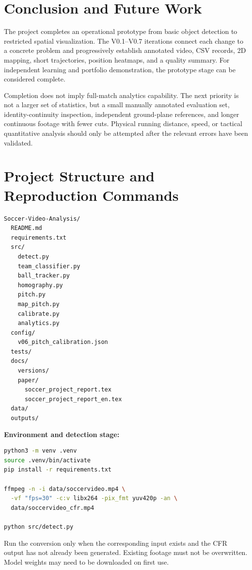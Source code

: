 \documentclass[11pt,a4paper]{article}
\begin{document}
\section{Conclusion and Future Work}

The project completes an operational prototype from basic object detection
to restricted spatial visualization.
The V0.1--V0.7 iterations connect each change to a concrete problem and
progressively establish annotated video, CSV records, 2D mapping, short
trajectories, position heatmaps, and a quality summary.
For independent learning and portfolio demonstration, the prototype stage
can be considered complete.

Completion does not imply full-match analytics capability.
The next priority is not a larger set of statistics, but a small manually
annotated evaluation set, identity-continuity inspection, independent
ground-plane references, and longer continuous footage with fewer cuts.
Physical running distance, speed, or tactical quantitative analysis should
only be attempted after the relevant errors have been validated.

\appendix
\section{Project Structure and Reproduction Commands}

\begin{lstlisting}
Soccer-Video-Analysis/
  README.md
  requirements.txt
  src/
    detect.py
    team_classifier.py
    ball_tracker.py
    homography.py
    pitch.py
    map_pitch.py
    calibrate.py
    analytics.py
  config/
    v06_pitch_calibration.json
  tests/
  docs/
    versions/
    paper/
      soccer_project_report.tex
      soccer_project_report_en.tex
  data/
  outputs/
\end{lstlisting}

\noindent\textbf{Environment and detection stage:}
\begin{lstlisting}[language=bash]
python3 -m venv .venv
source .venv/bin/activate
pip install -r requirements.txt

ffmpeg -n -i data/soccervideo.mp4 \
  -vf "fps=30" -c:v libx264 -pix_fmt yuv420p -an \
  data/soccervideo_cfr.mp4

python src/detect.py
\end{lstlisting}
Run the conversion only when the corresponding input exists and the CFR output
has not already been generated. Existing footage must not be overwritten.
Model weights may need to be downloaded on first use.
\end{document}

